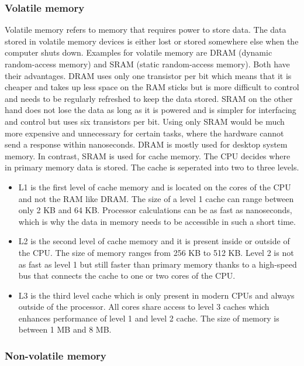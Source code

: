 \subsubsection{Volatile memory}

Volatile memory refers to memory that requires power to store data. The data stored in volatile memory
devices is either lost or stored somewhere else when the computer shuts down. Examples for volatile 
memory are DRAM (dynamic random-access memory) and SRAM (static random-access memory). Both have their
advantages. DRAM uses only one transistor per bit which means that it is cheaper and takes up less 
space on the RAM sticks but is more difficult to control and needs to be regularly refreshed to keep
the data stored. SRAM on the other hand does not lose the data as long as it is powered and is simpler for interfacing
and control but uses six transistors per bit. Using only SRAM would be much more expensive and unnecessary for 
certain tasks, where the hardware cannot send a response within nanoseconds. DRAM is mostly used for desktop system memory. 
In contrast, SRAM is used for cache memory. The CPU decides where in primary memory data is stored. The cache is seperated into two to three levels. 
\begin{itemize}
\item L1 is the first level of cache memory and is located on the cores of the CPU and not the RAM like DRAM. The 
size of a level 1 cache can range between only 2 KB and 64 KB. Processor calculations can be as fast as nanoseconds, which
is why the data in memory needs to be accessible in such a short time. 
\item L2 is the second level of cache memory
and it is present inside or outside of the CPU. The size of memory ranges from 256 KB to 512 KB.
Level 2 is not as fast as level 1 but still faster than primary memory thanks to a high-speed bus
that connects the cache to one or two cores of the CPU. 
\item L3 is the third level cache which is only present in modern CPUs and always outside
of the processor. All cores share access to level 3 caches which enhances performance of level 1 and
level 2 cache. The size of memory is between 1 MB and 8 MB.
\end{itemize}

\subsubsection{Non-volatile memory}

